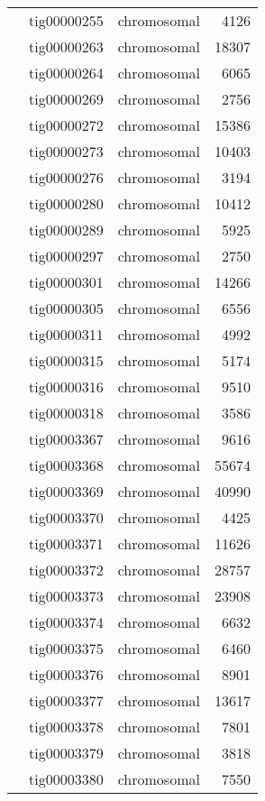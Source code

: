 {\begin{supertabular}{llcr}
         & tig00000255 & chromosomal & 4126 \\
         & tig00000263 & chromosomal & 18307 \\
         & tig00000264 & chromosomal & 6065 \\
         & tig00000269 & chromosomal & 2756 \\
         & tig00000272 & chromosomal & 15386 \\
         & tig00000273 & chromosomal & 10403 \\
         & tig00000276 & chromosomal & 3194 \\
         & tig00000280 & chromosomal & 10412 \\
         & tig00000289 & chromosomal & 5925 \\
         & tig00000297 & chromosomal & 2750 \\
         & tig00000301 & chromosomal & 14266 \\
         & tig00000305 & chromosomal & 6556 \\
         & tig00000311 & chromosomal & 4992 \\
         & tig00000315 & chromosomal & 5174 \\
         & tig00000316 & chromosomal & 9510 \\
         & tig00000318 & chromosomal & 3586 \\
         & tig00003367 & chromosomal & 9616 \\
         & tig00003368 & chromosomal & 55674 \\
         & tig00003369 & chromosomal & 40990 \\
         & tig00003370 & chromosomal & 4425 \\
         & tig00003371 & chromosomal & 11626 \\
         & tig00003372 & chromosomal & 28757 \\
         & tig00003373 & chromosomal & 23908 \\
         & tig00003374 & chromosomal & 6632 \\
         & tig00003375 & chromosomal & 6460 \\
         & tig00003376 & chromosomal & 8901 \\
         & tig00003377 & chromosomal & 13617 \\
         & tig00003378 & chromosomal & 7801 \\
         & tig00003379 & chromosomal & 3818 \\
         & tig00003380 & chromosomal & 7550 \\

\end{supertabular}}

